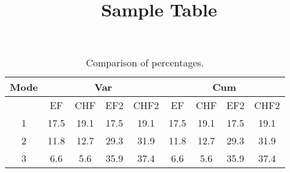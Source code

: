 \documentclass[a4paper,10pt]{article}
\title{Sample Table}
\author{}
\begin{document}
\maketitle
\begin{table}[!htbp]
\centering
\caption{Comparison of percentages.}
\begin{tabular}{*9c}
\toprule
Mode &  \multicolumn{4}{c}{Var} & \multicolumn{4}{c}{Cum}\\
\midrule
{}   & EF   & CHF    & EF2   & CHF2 & EF   & CHF    & EF2   & CHF2\\
1   &  17.5 & 19.1   & 17.5  & 19.1 &  17.5 & 19.1   & 17.5  & 19.1\\
2   &  11.8 & 12.7   & 29.3  & 31.9 &  11.8 & 12.7   & 29.3  & 31.9\\
3   &  6.6  &  5.6   & 35.9  & 37.4 &  6.6  &  5.6   & 35.9  & 37.4\\
\bottomrule
\end{tabular}
\end{table}
\end{document}
